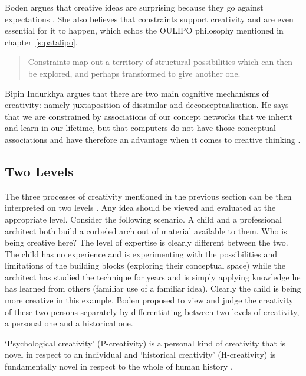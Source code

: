 Boden argues that creative ideas are surprising because they go against expectations \citeyear{Boden2003}. She also believes that constraints support creativity and are even essential for it to happen, which echos the \ac{OULIPO} philosophy mentioned in chapter~\ref{s:patalipo}.

\begin{quotation}
  Constraints map out a territory of structural possibilities which can then be explored, and perhaps transformed to give another one. 
\end{quotation}

Bipin Indurkhya argues that there are two main cognitive mechanisms of creativity: namely juxtaposition of dissimilar and deconceptualisation. He says that we are constrained by associations of our concept networks that we inherit and learn in our lifetime, but that computers do not have those conceptual associations and have therefore an advantage when it comes to creative thinking \autocite{Indurkhya1997}.


\subsection{Two Levels}
\label{s:pandh}

The three processes of creativity mentioned in the previous section can be then interpreted on two levels \autocite{Boden2003}. Any idea should be viewed and evaluated at the appropriate level. Consider the following scenario. A child and a professional architect both build a corbeled arch out of material available to them. Who is being creative here? The level of expertise is clearly different between the two. The child has no experience and is experimenting with the possibilities and limitations of the building blocks (exploring their conceptual space) while the architect has studied the technique for years and is simply applying knowledge he has learned from others (familiar use of a familiar idea). Clearly the child is being more creative in this example. Boden proposed to view and judge the creativity of these two persons separately by differentiating between two levels of creativity, a personal one and a historical one. 

`Psychological creativity' (P-creativity) is a personal kind of creativity that is novel in respect to an individual and `historical creativity' (H-creativity) is fundamentally novel in respect to the whole of human history \autocite{Boden2003}. 


